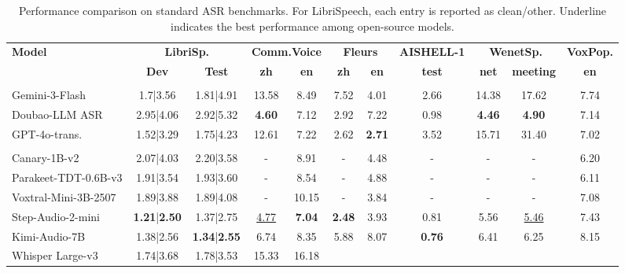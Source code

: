 \documentclass{llmxive}
\begin{document}
\begin{table}[t]

\vspace{2mm}

\caption{Performance comparison on standard ASR benchmarks. For LibriSpeech, each entry is reported as clean/other. Underline indicates the best performance among open-source models.}
\vspace{-2mm}
\label{tab:main_standard}
\setlength{\tabcolsep}{3.9pt}
\begin{tabular}{lcccccccccc}
\toprule
\textbf{Model} &
\multicolumn{2}{c}{\textbf{LibriSp.}} &
\multicolumn{2}{c}{\textbf{Comm.Voice}} &
\multicolumn{2}{c}{\textbf{Fleurs}} &
\textbf{AISHELL-1} &
\multicolumn{2}{c}{\textbf{WenetSp.}} &
\textbf{VoxPop.} \\
\cmidrule(lr){2-3}
\cmidrule(lr){4-5}
\cmidrule(lr){6-7}
\cmidrule(lr){9-10}
&
\textbf{Dev} &
\textbf{Test} &
\textbf{zh} &
\textbf{en} &
\textbf{zh} &
\textbf{en} &
\textbf{test} &
\textbf{net} &
\textbf{meeting} &
\textbf{en} \\
\midrule
\rowcolor{headerblue}
\multicolumn{11}{l}{\textit{Closed-source models}} \\
Gemini-3-Flash &
1.7|3.56 &
1.81|4.91 &
13.58 &
8.49 &
7.52 &
4.01 &
2.66 &
14.38 &
17.62 &
7.74 \\
Doubao-LLM ASR &
2.95|4.06 &
2.92|5.32 &
\textbf{4.60} &
7.12 &
2.92 &
7.22 &
0.98 &
\textbf{4.46} &
\textbf{4.90} &
7.14 \\
GPT-4o-trans. &
1.52|3.29 &
1.75|4.23 &
12.61 &
7.22 &
2.62 &
\textbf{2.71} &
3.52 &
15.71 &
31.40 &
7.02 \\
\rowcolor{headerblue}
\multicolumn{11}{l}{\textit{Open-source models}} \\
Canary-1B-v2 &
2.07|4.03 &
2.20|3.58 &
- &
8.91 &
- &
4.48 &
- &
- &
- &
6.20 \\
Parakeet-TDT-0.6B-v3 &
1.91|3.54 &
1.93|3.60 &
- &
8.54 &
- &
4.88 &
- &
- &
- &
6.11 \\
Voxtral-Mini-3B-2507 &
1.89|3.88 &
1.89|4.08 &
- &
10.15 &
- &
3.84 &
- &
- &
- &
7.08 \\
Step-Audio-2-mini &
\textbf{1.21}|\textbf{2.50} &
1.37|2.75 &
\underline{4.77} &
\textbf{7.04} &
\textbf{2.48} &
3.93 &
0.81 &
5.56 &
\underline{5.46} &
7.43 \\
Kimi-Audio-7B &
1.38|2.56 &
\textbf{1.34}|\textbf{2.55} &
6.74 &
8.35 &
5.88 &
8.07 &
\textbf{0.76} &
6.41 &
6.25 &
8.15 \\
Whisper Large-v3 &
1.74|3.68 &
1.78|3.53 &
15.33 &
16.18 &

\end{tabular}
\end{table}
\end{document}
